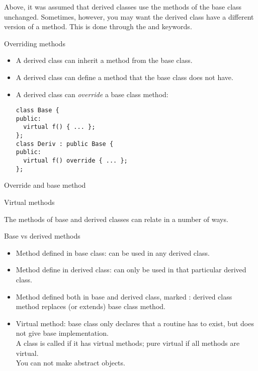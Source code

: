 Above, it was assumed that derived classes use the methods
of the base class unchanged.
Sometimes, however, you may want the derived class have a different version
of a method.
This is done through the  and  keywords.

\begin{block}{Overriding methods}
  \label{sl:obj-method-override}
  \begin{itemize}
  \item A derived class can inherit a method from the base class.
  \item A derived class can define a method that the base class does
    not have.
  \item A derived class can \emph{override} a
    base class method:
\begin{lstlisting}
class Base {
public:
  virtual f() { ... };
};
class Deriv : public Base {
public:
  virtual f() override { ... };
};
\end{lstlisting}
  \end{itemize}
\end{block}

\begin{block}{Override and base method}
  \label{sl:virtualoverride}
\end{block}

 {Virtual methods}

The methods of base and derived classes can relate in a number of ways.

\begin{block}{Base vs derived methods}
  \begin{itemize}
  \item Method defined in base class: can be used in any derived class.
  \item Method define in derived class: can only be used in that
    particular derived class.
  \item Method defined both in base and derived class, marked
    : derived class method replaces (or extends)
    base class method.
  \item Virtual method: base class only declares that a routine has to
    exist, but does not give base implementation.\\ A class is called
     if it has virtual methods; pure
    virtual if all methods are virtual.\\ You can not make abstract objects.
  \end{itemize}  
\end{block}

